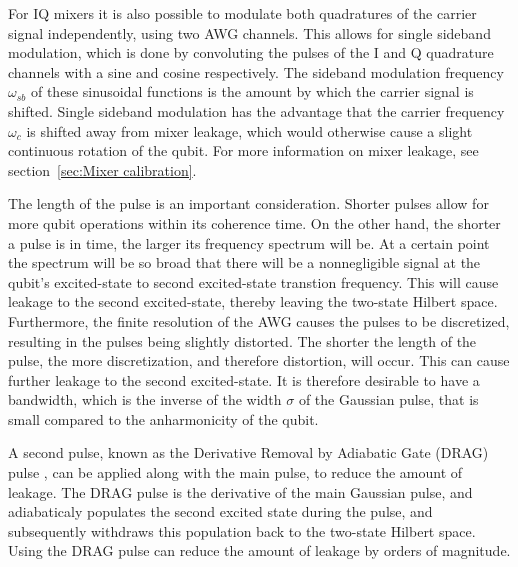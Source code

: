         For IQ mixers it is also possible to modulate both quadratures of the carrier signal independently, using two AWG channels. This allows for single sideband modulation, which is done by convoluting the pulses of the I and Q quadrature channels with a sine and cosine respectively. The sideband modulation frequency $\omega_{sb}$ of these sinusoidal functions is the amount by which the carrier signal is shifted. Single sideband modulation has the advantage that the carrier frequency $\omega_c$ is shifted away from mixer leakage, which would otherwise cause a slight continuous rotation of the qubit. For more information on mixer leakage, see section~\ref{sec:Mixer calibration}.

        The length of the pulse is an important consideration. Shorter pulses allow for more qubit operations within its coherence time. On the other hand, the shorter a pulse is in time, the larger its frequency spectrum will be. At a certain point the spectrum will be so broad that there will be a nonnegligible signal at the qubit's excited-state to second excited-state transtion frequency. This will cause leakage to the second excited-state, thereby leaving the two-state Hilbert space.
        Furthermore, the finite resolution of the AWG causes the pulses to be discretized, resulting in the pulses being slightly distorted. The shorter the length of the pulse, the more discretization, and therefore distortion, will occur. This can cause further leakage to the second excited-state. It is therefore desirable to have a bandwidth, which is the inverse of the width $\sigma$ of the Gaussian pulse, that is small compared to the anharmonicity of the qubit.

        A second pulse, known as the Derivative Removal by Adiabatic Gate (DRAG) pulse \cite{motzoi2009simple}, can be applied along with the main pulse, to reduce the amount of leakage. The DRAG pulse is the derivative of the main Gaussian pulse, and adiabaticaly populates the second excited state during the pulse, and subsequently withdraws this population back to the two-state Hilbert space. Using the DRAG pulse can reduce the amount of leakage by orders of magnitude.

